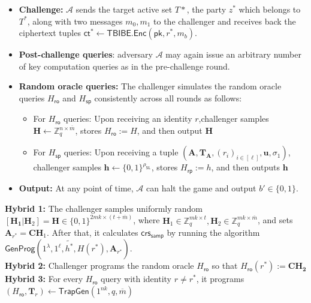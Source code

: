 \begin{itemize}
\item \textbf{Challenge:} $\mathcal{A}$ sends the target active set $T*$, the party $z^*$ which belongs to $T^*$, along with two messages $m_0, m_1$ to the challenger and receives back the ciphertext tuples $\mathsf{ct}^* \leftarrow \mathsf{TBIBE.Enc}(\mathsf{pk}, r^*, m_b)$. 

\item \textbf{Post-challenge queries}: adversary $\mathcal{A}$ may again issue an arbitrary number of key computation queries as in the pre-challenge round.


\item \textbf{Random oracle queries:}
The challenger simulates the random oracle queries $H_{\mathsf{ro}}$ and $H_{\mathsf{sp}}$ consistently across all rounds as follows:
\begin{itemize}
    \item For $H_{\mathsf{ro}}$ queries: Upon receiving an identity $r$,challenger samples $\mathbf{H} \leftarrow \mathbb{Z}_q^{n \times \overline{m}}$, stores $H_{\mathsf{ro}} := H$, and then output $\mathbf{H}$
    \item For $H_{\mathsf{sp}}$ queries: Upon receiving a tuple $(\mathbf{A},\mathbf{T_A},(r_i)_{i \in [\ell]}, \mathbf{u}, \sigma_1)$, challenger samples $\mathbf{h} \leftarrow \{0,1\}^{\rho_{\mathsf{SL}}}$, stores $H_{\mathsf{rp}} := h$, and then outputs $\mathbf{h}$
\end{itemize}
\item \textbf{Output:} At any point of time, $\mathcal{A}$ can halt the game and output $b' \in \{0,1\}$.

\end{itemize} 
\medskip
\noindent\textbf{Hybrid 1:} The challenger samples uniformly random $[\mathbf{H_1}|\mathbf{H}_2]=\mathbf{H} \in \{0,1\}^{2mk \times (t + \overline{m})}$, where $\mathbf{H}_1\in \mathbb{Z}_q^{mk\times t},\mathbf{H}_2  \in \mathbb{Z}_q^{mk \times \overline{m}}$, and sets $\mathbf{A}_{r^*} = \mathbf{CH}_1$. After that, it calculates $\mathsf{crs_{samp}}$ by running  the algorithm $\mathsf{GenProg}(1^\lambda, 1^\ell, \tilde{h^*}, H(r^*),\mathbf{A}_{r^*})$.\\
\medskip
\noindent\textbf{Hybrid 2:} Challenger programs the random oracle $H_{\mathsf{ro}}$ so that $H_{\mathsf{ro}}(r^*):=\mathbf{CH_2}$ \\
\medskip
\noindent\textbf{Hybrid 3:} For every $H_{\mathsf{ro}}$ query with identity $r \neq r^*$, it programs $(H_{\mathsf{ro}},\mathbf{T}_r) \leftarrow \mathsf{TrapGen}(1^{nk},q,\overline{m})$\\
